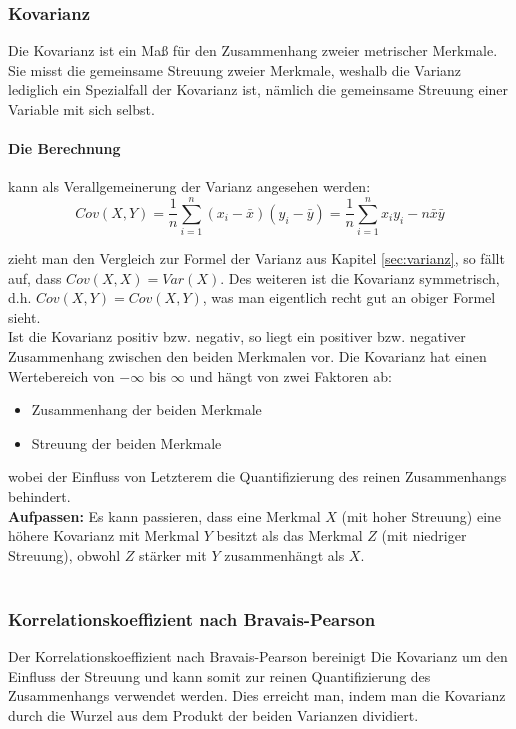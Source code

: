 \documentclass[a4paper]{article}
\newcommand\dangersign{%
 \makebox[1.8em][c]{%
 \makebox[0pt][c]{\raisebox{.15em}{\small!}}%
 \makebox[0pt][c]{\color{red}\Large$\triangle$}}}%
\begin{document}
\subsubsection{Kovarianz}
Die Kovarianz ist ein Maß für den Zusammenhang zweier metrischer Merkmale. Sie misst die gemeinsame Streuung zweier Merkmale, weshalb die Varianz lediglich ein Spezialfall der Kovarianz ist, nämlich die gemeinsame Streuung einer Variable mit sich selbst.

\paragraph{Die Berechnung} kann als Verallgemeinerung der Varianz angesehen werden:
$$Cov (X,Y) = \frac{1}{n}\sum_{i=1}^n(x_i-\bar{x})(y_i-\bar{y}) = \frac{1}{n}\sum_{i=1}^nx_iy_i-n\bar{x}\bar{y}$$

\noindent zieht man den Vergleich zur Formel der Varianz aus Kapitel \ref{sec:varianz}, so fällt auf, dass $Cov(X,X) = Var(X)$. Des weiteren ist die Kovarianz symmetrisch, d.h. $Cov(X,Y) = Cov(X,Y)$, was man eigentlich recht gut an obiger Formel sieht.\\
Ist die Kovarianz positiv bzw. negativ, so liegt ein positiver bzw. negativer Zusammenhang zwischen den beiden Merkmalen vor.
Die Kovarianz hat einen Wertebereich von $-\infty$ bis $\infty$ und hängt von zwei Faktoren ab:
\begin{itemize}
    \item Zusammenhang der beiden Merkmale
    \item Streuung der beiden Merkmale
\end{itemize}
wobei der Einfluss von Letzterem die Quantifizierung des reinen Zusammenhangs behindert.\\

\noindent \dangersign \textbf{Aufpassen:} Es kann passieren, dass eine Merkmal $X$ (mit hoher Streuung) eine höhere Kovarianz mit Merkmal $Y$ besitzt als das Merkmal $Z$ (mit niedriger Streuung), obwohl $Z$ stärker mit $Y$ zusammenhängt als $X$.\\

\noindent {}\\

\subsubsection{Korrelationskoeffizient nach Bravais-Pearson}\label{sec:cor-bp}
Der Korrelationskoeffizient nach Bravais-Pearson bereinigt Die Kovarianz um den Einfluss der Streuung und kann somit zur reinen Quantifizierung des Zusammenhangs verwendet werden. Dies erreicht man, indem man die Kovarianz durch die Wurzel aus dem Produkt der beiden Varianzen dividiert.
\end{document}
